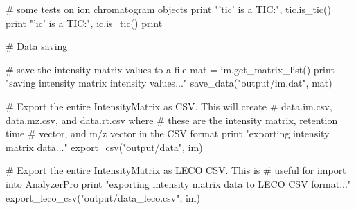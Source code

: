 # some tests on ion chromatogram objects
print "'tic' is a TIC:", tic.is_tic()
print "'ic' is a TIC:", ic.is_tic()
print

# Data saving

# save the intensity matrix values to a file
mat = im.get_matrix_list()
print "saving intensity matrix intensity values..."
save_data("output/im.dat", mat)

# Export the entire IntensityMatrix as CSV. This will create
# data.im.csv, data.mz.csv, and data.rt.csv where
# these are the intensity matrix, retention time
# vector, and m/z vector in the CSV format
print "exporting intensity matrix data..."
export_csv("output/data", im)

# Export the entire IntensityMatrix as LECO CSV. This is
# useful for import into AnalyzerPro
print "exporting intensity matrix data to LECO CSV format..."
export_leco_csv("output/data_leco.csv", im)
